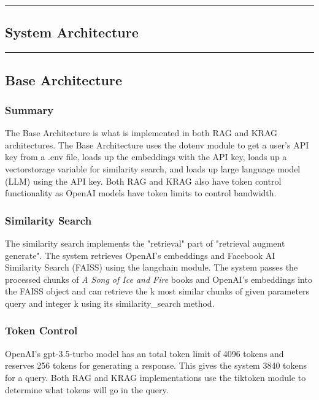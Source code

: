 {\color{gray}\hrule}
\begin{center}
\section{System Architecture}
\bigskip
\end{center}
{\color{gray}\hrule}

\subsection{Base Architecture}

\subsubsection{Summary}
The Base Architecture is what is implemented in both RAG and KRAG architectures. The Base Architecture uses the dotenv module to get a user's API key from a .env file, loads up the embeddings with the API key, loads up a vectorstorage variable for similarity search, and loads up large language model (LLM) using the API key. Both RAG and KRAG also have token control functionality as OpenAI models have token limits to control bandwidth.

\subsubsection{Similarity Search}
The similarity search implements the "retrieval" part of "retrieval augment generate". The system retrieves OpenAI's embeddings and Facebook AI Similarity Search (FAISS) using the langchain module. The system passes the processed chunks of \textit{A Song of Ice and Fire} books and OpenAI's embeddings into the FAISS object and can retrieve the k most similar chunks of given parameters query and integer k using its similarity\_search method.

\subsubsection{Token Control}
OpenAI's gpt-3.5-turbo model has an total token limit of 4096 tokens and reserves 256 tokens for generating a response. This gives the system 3840 tokens for a query. Both RAG and KRAG implementations use the tiktoken module to determine what tokens will go in the query.

